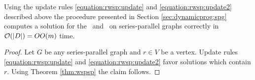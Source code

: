 \begin{theorem}
	Using the update rules \eqref{equation:rwsp:update} and \eqref{equation:rwsp:update2} described above the procedure presented in Section \ref{sec:dynamicprog:spg} computes a solution for the \RWSP\ and \RWISP\ on series-parallel graphs correctly in $\mathcal{O}(|D|) = \\OO(m)$ time.
\end{theorem}
\begin{proof} 
	Let $G$ be any series-parallel graph and $r \in V$ be a vertex. Update rules \eqref{equation:rwsp:update} and \eqref{equation:rwsp:update2} favor solutions which contain $r$. Using Theorem \ref{thm:wspsp} the claim follows.
\end{proof}